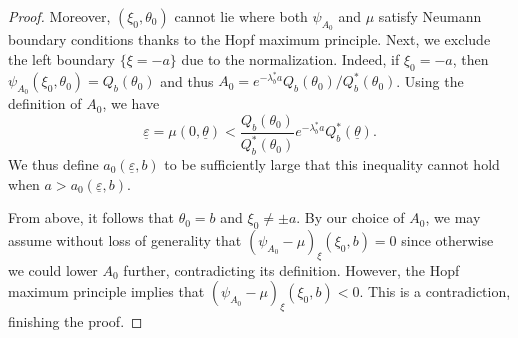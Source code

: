 \documentclass[11pt]{article}    %
\newcommand{\EB}[1]{\textcolor{blue}{#1}}
\renewcommand{\epsilon}{\varepsilon}
\newcommand{\eps}{\varepsilon}
\begin{document}
\begin{proof}
 Moreover, $(\xi_0,\theta_0)$ cannot lie where both $\psi_{A_0}$ and $\mu$ satisfy Neumann boundary conditions thanks to the Hopf maximum principle.  Next, we exclude the left boundary $\{\xi=-a\}$ due to the normalization. Indeed, if $\xi_0 = -a$, then $\psi_{A_0} (\xi_0, \theta_0) = Q_b(\theta_0)$ and thus $A_0 = e^{- \lambda_b^* a} Q_b(\theta_0)/Q_b^*(\theta_0)$. Using the definition of $A_0$, we have 
\begin{equation*}
	\underline\epsilon = \mu(0,\underline\theta) < \frac{Q_b(\theta_0)}{Q_b^*(\theta_0)}e^{- \lambda_b^* a} Q_b^* (\underline \theta ).
\end{equation*}
We thus define $a_0(\underline\epsilon,b)$ to be sufficiently large that this inequality cannot hold when $ a > a_0(\underline\epsilon,b)$.

From above, it follows that $\theta_0 = b$ and $\xi_0 \neq \pm a$.  By our choice of $A_0$, we may assume without loss of generality that $(\psi_{A_0} - \mu)_\xi(\xi_0,b) = 0$ since otherwise we could lower $A_0$ further, contradicting its definition.  However, the Hopf maximum principle implies that $(\psi_{A_0} - \mu)_{\xi}(\xi_0,b) < 0$.  This is a contradiction, finishing the proof.
%
%
%
%

\end{proof}
\end{document}
